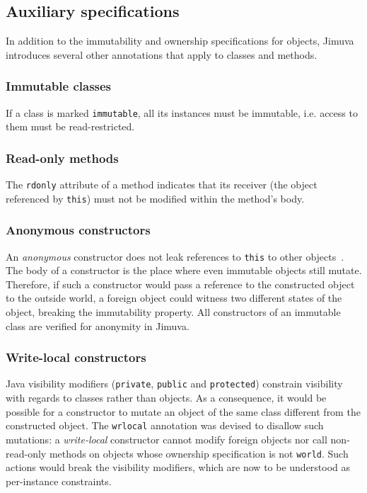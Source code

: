 \documentclass{pracamgr}
\theoremstyle{break}
\theoremstyle{break}
\theoremstyle{break}
\begin{document}
\subsection{Auxiliary specifications}
\label{sub:jimuva-aux}

In addition to the immutability and ownership specifications for
objects, Jimuva introduces several other annotations that apply to
classes and methods.

\subsubsection{Immutable classes}

If a class is marked \texttt{immutable}, all its instances must be
immutable, i.e. access to them must be read-restricted.

\subsubsection{Read-only methods}

The \texttt{rdonly} attribute of a method indicates that its receiver
(the object referenced by \texttt{this}) must not be modified within
the method's body.

\subsubsection{Anonymous constructors}

An \emph{anonymous} constructor does not leak references to
\texttt{this} to other objects~\cite{vitek}. The body of a constructor
is the place where even immutable objects still mutate. Therefore, if
such a constructor would pass a reference to the constructed object to
the outside world, a foreign object could witness two different states
of the object, breaking the immutability property. All constructors of
an immutable class are verified for anonymity in
Jimuva.

\subsubsection{Write-local constructors}
\label{sub:jimuva-wrlocal}

Java visibility modifiers (\texttt{private}, \texttt{public} and
\texttt{protected}) constrain visibility with regards to classes
rather than objects. As a consequence, it would be possible for a
constructor to mutate an object of the same class different from the
constructed object. The \texttt{wrlocal} annotation was devised to
disallow such mutations: a \emph{write-local} constructor cannot
modify foreign objects nor call non-read-only methods on objects whose
ownership specification is not \texttt{world}. Such actions would
break the visibility modifiers, which are now to be understood as
per-instance constraints.
\end{document}
